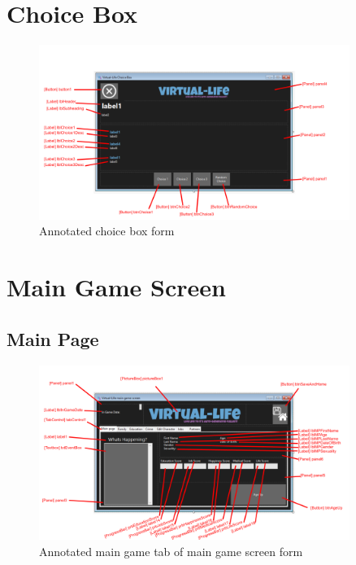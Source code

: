 \section{Choice Box}
\begin{figure}[H]
    \centering
    \includegraphics[width=0.9\textwidth]{images/forms/choice-box.png}
    \caption{Annotated choice box form}
    \label{fig:forms-choiceBox}
\end{figure}

\section{Main Game Screen}
\subsection{Main Page}
\begin{figure}[H]
    \centering
    \includegraphics[width=0.9\textwidth]{images/forms/main-main.png}
    \caption{Annotated main game tab of main game screen form}
    \label{fig:forms-main-main}
\end{figure}

